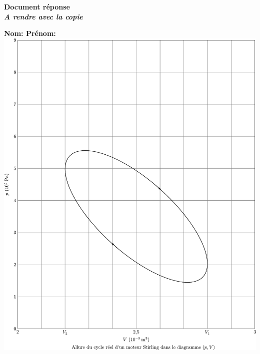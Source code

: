 \documentclass[a4paper, 12pt, garamond]{book}
\begin{document}
\newpage

\begin{tcolorbox}
	\centering\huge{\textbf{Document réponse \\\emph{A rendre avec la copie}}}
\end{tcolorbox}

\textbf{Nom: \hspace{7cm} Prénom:}\\

\hspace{-1cm}
\includegraphics[scale=1.1]{figures/pb-stirling-cycle.pdf}
\end{document}
